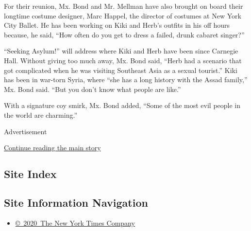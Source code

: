 For their reunion, Mx. Bond and Mr. Mellman have also brought on board
their longtime costume designer, Marc Happel, the director of costumes
at New York City Ballet. He has been working on Kiki and Herb's outfits
in his off hours because, he said, ``How often do you get to dress a
failed, drunk cabaret singer?''

``Seeking Asylum!'' will address where Kiki and Herb have been since
Carnegie Hall. Without giving too much away, Mx. Bond said, ``Herb had a
scenario that got complicated when he was visiting Southeast Asia as a
sexual tourist.'' Kiki has been in war-torn Syria, where ``she has a
long history with the Assad family,'' Mx. Bond said. ``But you don't
know what people are like.''

With a signature coy smirk, Mx. Bond added, ``Some of the most evil
people in the world are charming.''

Advertisement

\protect\hyperlink{after-bottom}{Continue reading the main story}

\hypertarget{site-index}{%
\subsection{Site Index}\label{site-index}}

\hypertarget{site-information-navigation}{%
\subsection{Site Information
Navigation}\label{site-information-navigation}}

\begin{itemize}
\tightlist
\item
  \href{https://help.nytimes3xbfgragh.onion/hc/en-us/articles/115014792127-Copyright-notice}{©~2020~The
  New York Times Company}
\end{itemize}

